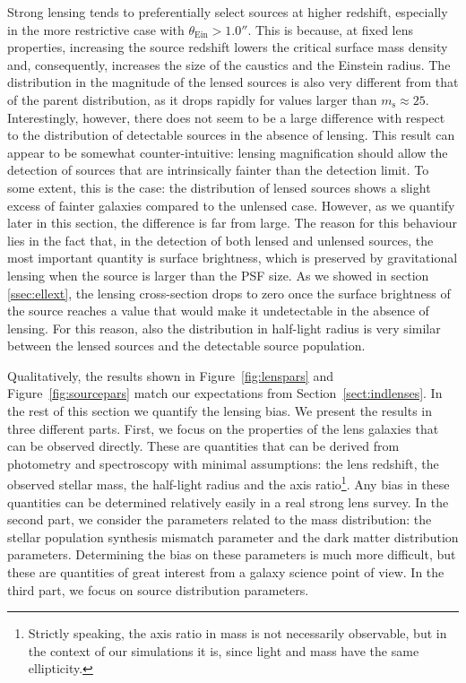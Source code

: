 \documentclass{aa}
\def\msource{m_{\mathrm{s}}}
\def\tein{\theta_{\mathrm{Ein}}}
\def\Sref#1{Section~\ref{#1}\xspace}
\def\Fref#1{Figure~\ref{#1}\xspace}
\begin{document}
Strong lensing tends to preferentially select sources at higher redshift, especially in the more restrictive case with $\tein > 1.0''$.
This is because, at fixed lens properties, increasing the source redshift lowers the critical surface mass density and, consequently, increases the size of the caustics and the Einstein radius.
The distribution in the magnitude of the lensed sources is also very different from that of the parent distribution, as it drops rapidly for values larger than $\msource\approx25$.
Interestingly, however, there does not seem to be a large difference with respect to the distribution of detectable sources in the absence of lensing.
This result can appear to be somewhat counter-intuitive: lensing magnification should allow the detection of sources that are intrinsically fainter than the detection limit. To some extent, this is the case: the distribution of lensed sources shows a slight excess of fainter galaxies compared to the unlensed case. However, as we quantify later in this section, the difference is far from large.
The reason for this behaviour lies in the fact that, in the detection of both lensed and unlensed sources, the most important quantity is surface brightness, which is preserved by gravitational lensing when the source is larger than the PSF size.
As we showed in section \ref{ssec:ellext}, the lensing cross-section drops to zero once the surface brightness of the source reaches a value that would make it undetectable in the absence of lensing.
For this reason, also the distribution in half-light radius is very similar between the lensed sources and the detectable source population.

Qualitatively, the results shown in \Fref{fig:lenspars} and \Fref{fig:sourcepars} match our expectations from \Sref{sect:indlenses}.
In the rest of this section we quantify the lensing bias.
We present the results in three different parts.
First, we focus on the properties of the lens galaxies that can be observed directly. These are quantities that can be derived from photometry and spectroscopy with minimal assumptions: the lens redshift, the observed stellar mass, the half-light radius and the axis ratio\footnote{Strictly speaking, the axis ratio in mass is not necessarily observable, but in the context of our simulations it is, since light and mass have the same ellipticity.}.
Any bias in these quantities can be determined relatively easily in a real strong lens survey.
In the second part, we consider the parameters related to the mass distribution: the stellar population synthesis mismatch parameter and the dark matter distribution parameters. Determining the bias on these parameters is much more difficult, but these are quantities of great interest from a galaxy science point of view.
In the third part, we focus on source distribution parameters. 
\end{document}
